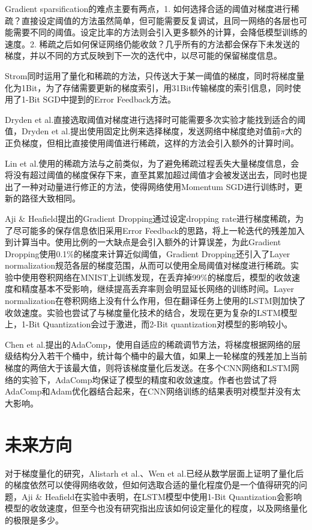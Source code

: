 \documentclass[12pt,onecolumn,letterpaper]{article}
\begin{document}
    Gradient sparsification的难点主要有两点，1. 如何选择合适的阈值对梯度进行稀疏？直接设定阈值的方法虽然简单，但可能需要反复调试，且同一网络的各层也可能需要不同的阈值。设定比率的方法则会引入更多额外的计算，会降低模型训练的速度。2. 稀疏之后如何保证网络仍能收敛？几乎所有的方法都会保存下未发送的梯度，并以不同的方式反映到下一次的迭代中，以尽可能的保留梯度信息。

    Strom\cite{International}同时运用了量化和稀疏的方法，只传送大于某一阈值的梯度，同时将梯度量化为1Bit，为了存储需要更新的梯度索引，用31Bit传输梯度的索引信息，同时使用了1-Bit SGD中提到的Error Feedback方法。

    Dryden et al.\cite{Dryden2016}直接选取阈值对梯度进行选择时可能需要多次实验才能找到适合的阈值，Dryden et al.提出使用固定比例来选择梯度，发送网络中梯度绝对值前$\pi$大的正负梯度，但相比直接使用阈值进行稀疏，这样的方法会引入额外的计算时间。

    Lin et al.\cite{Lin2017}使用的稀疏方法与之前类似，为了避免稀疏过程丢失大量梯度信息，会将没有超过阈值的梯度保存下来，直至其累加超过阈值才会被发送出去，同时也提出了一种对动量进行修正的方法，使得网络使用Momentum SGD进行训练时，更新的路径大致相同。

    Aji \& Heafield\cite{Aji2017}提出的Gradient Dropping通过设定dropping rate进行梯度稀疏，为了尽可能多的保存信息依旧采用Error Feedback的思路，将上一轮迭代的残差加入到计算当中。使用比例的一大缺点是会引入额外的计算误差，为此Gradient Dropping使用0.1\%的梯度来计算近似阈值，Gradient Dropping还引入了Layer normalization\cite{Ba2016}规范各层的梯度范围，从而可以使用全局阈值对梯度进行稀疏。实验中使用卷积网络在MNIST上训练发现，在丢弃掉99\%的梯度后，模型的收敛速度和精度基本不受影响，继续提高丢弃率则会明显延长网络的训练时间。Layer normalization在卷积网络上没有什么作用，但在翻译任务上使用的LSTM则加快了收敛速度。实验也尝试了与梯度量化技术的结合，发现在更为复杂的LSTM模型上，1-Bit Quantization会过于激进，而2-Bit quantization对模型的影响较小。

    Chen et al.\cite{Chen}提出的AdaComp，使用自适应的稀疏调节方法，将梯度根据网络的层级结构分入若干个桶中，统计每个桶中的最大值，如果上一轮梯度的残差加上当前梯度的两倍大于该最大值，则将该梯度量化后发送。在多个CNN网络和LSTM网络的实验下，AdaComp均保证了模型的精度和收敛速度。作者也尝试了将AdaComp和Adam优化器结合起来，在CNN网络训练的结果表明对模型并没有太大影响。


    \section{未来方向}
    对于梯度量化的研究，Alistarh et al.\cite{Alistarh}、Wen et al.\cite{Wen}已经从数学层面上证明了量化后的梯度依然可以使得网络收敛，但如何选取合适的量化程度仍是一个值得研究的问题，Aji \& Heafield\cite{Aji2017}在实验中表明，在LSTM模型中使用1-Bit Quantization会影响模型的收敛速度，但至今也没有研究指出应该如何设定量化的程度，以及网络量化的极限是多少。
\end{document}
